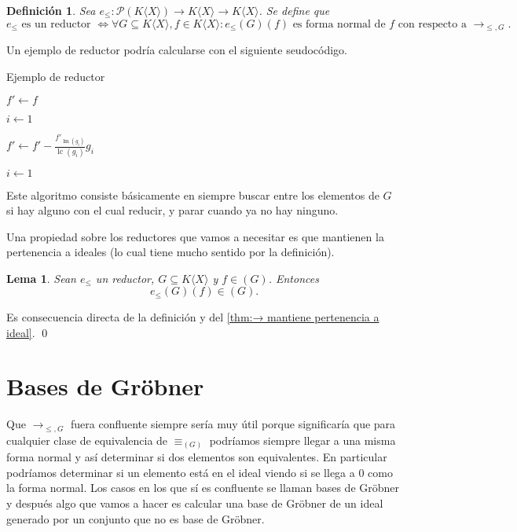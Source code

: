 \documentclass[12pt]{report}
\theoremstyle{customstyle}
\newtheorem{definition}[theorem]{Definición}
\newtheorem{lemma}[theorem]{Lema}
\renewenvironment{proof}[1][\proofname]{{\noindent \bfseries #1: }}{\qed} %
\theoremstyle{factstyle}
\DeclareMathOperator{\sop}{sop}
\DeclareMathOperator{\lm}{lm}
\DeclareMathOperator{\lc}{lc}
\begin{document}
\begin{definition}\label{def:reductor}
  Sea $e_≤ : 𝒫(K⟨X⟩) → K⟨X⟩ → K⟨X⟩$. Se define que
  \[ e_≤\text{ es un reductor }⇔ ∀G ⊆ K⟨X⟩, f ∈ K⟨X⟩ : e_≤(G)(f)\text{ es forma normal de }f\text{ con respecto a }→_{≤, G} \text{.} \]
\end{definition}

Un ejemplo de reductor podría calcularse con el siguiente seudocódigo.

\begin{algorithm}[H] %
  \caption{Ejemplo de reductor}\label{alg:reductor}
  $f' ← f$

  $i ← 1$

   {
     {
      \If{$g_i ∈ \sop(f')$} {
        $f' ← f' - \frac{f'_{\lm(g_i)}}{\lc(g_i)}g_i$

        $i ← 1$

        \Break
      }
    }
  }
\end{algorithm}

Este algoritmo consiste básicamente en siempre buscar entre los elementos de $G$ si hay alguno con el cual reducir, y parar cuando ya no hay ninguno.

Una propiedad sobre los reductores que vamos a necesitar es que mantienen la pertenencia a ideales (lo cual tiene mucho sentido por la definición).

\begin{lemma}\label{lemma:e mantiene pertenencia a ideal}
  Sean $e_≤$ un reductor, $G ⊆ K⟨X⟩$ y $f ∈ (G)$. Entonces
  \[ e_≤(G)(f) ∈ (G) \text{.}\]
\end{lemma}
\begin{proof}
  Es consecuencia directa de la definición y del \cref{thm:→ mantiene pertenencia a ideal}.
\end{proof}

\section{Bases de Gröbner}

Que $→_{≤, G}$ fuera confluente siempre sería muy útil porque significaría que para cualquier clase de equivalencia de $≡_{(G)}$ podríamos siempre llegar a una misma forma normal y así determinar si dos elementos son equivalentes. En particular podríamos determinar si un elemento está en el ideal viendo si se llega a $0$ como la forma normal. Los casos en los que sí es confluente se llaman bases de Gröbner y después algo que vamos a hacer es calcular una base de Gröbner de un ideal generado por un conjunto que no es base de Gröbner.
\end{document}
